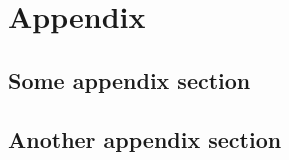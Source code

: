\chapter{Appendix}
    \label{chap:appendix}


\section{Some appendix section}
    \label{sec:app:something}

\kant[17-18]



\clearpage
\section{Another appendix section}
    \label{sec:app:another}

\kant[33]

